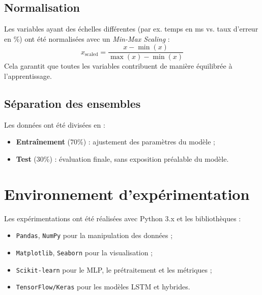 \documentclass[a4paper,12pt]{report}
\begin{document}
\subsection*{Normalisation}
Les variables ayant des échelles différentes (par ex. temps en ms vs. taux d’erreur en \%) ont été normalisées avec un \textit{Min-Max Scaling} :
\[
x_{\text{scaled}} = \frac{x - \min(x)}{\max(x) - \min(x)}
\]
Cela garantit que toutes les variables contribuent de manière équilibrée à l’apprentissage.


\subsection*{Séparation des ensembles}
Les données ont été divisées en :
\begin{itemize}
    \item \textbf{Entraînement} (70\%) : ajustement des paramètres du modèle ;
    \item \textbf{Test} (30\%) : évaluation finale, sans exposition préalable du modèle.
\end{itemize}

\section{Environnement d’expérimentation}

Les expérimentations ont été réalisées avec Python 3.x et les bibliothèques :
\begin{itemize}
    \item \texttt{Pandas}, \texttt{NumPy} pour la manipulation des données ;
    \item \texttt{Matplotlib}, \texttt{Seaborn} pour la visualisation ;
    \item \texttt{Scikit-learn} pour le MLP, le prétraitement et les métriques ;
    \item \texttt{TensorFlow/Keras} pour les modèles LSTM et hybrides.
\end{itemize}
\end{document}
